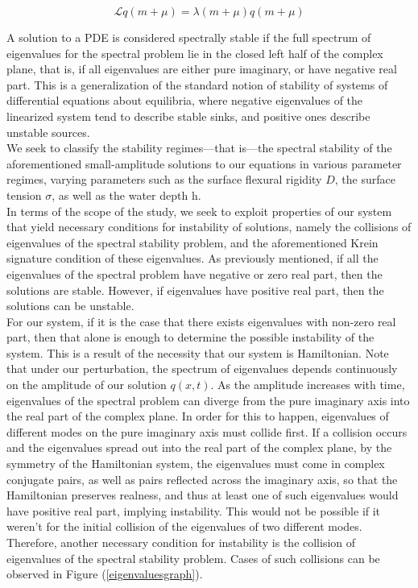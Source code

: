 \documentclass{article}
\begin{document}
\begin{equation} \label{eq1}
  \mathscr{L}q(m+\mu) =   \lambda(m+\mu) q(m+\mu)
\end{equation}

A solution to a PDE is considered spectrally stable if the full spectrum of eigenvalues for the spectral problem lie in the closed left half of the complex plane, that is, if all eigenvalues are either pure imaginary, or have negative real part. This is a generalization of the standard notion of stability of systems of differential equations about equilibria, where negative eigenvalues of the linearized system tend to describe stable sinks, and positive ones describe unstable sources.\\

We seek to classify the stability regimes—that is—the spectral stability of the aforementioned small-amplitude solutions to our equations in various parameter regimes, varying parameters such as the surface flexural rigidity \(D\), the surface tension \(\sigma\), as well as the water depth h. \\



In terms of the scope of the study, we seek to exploit properties of our system that yield necessary conditions for instability of solutions, namely the collisions of eigenvalues of the spectral stability problem, and the aforementioned Krein signature condition of these eigenvalues. As previously mentioned, if all the eigenvalues of the spectral problem have negative or zero real part, then the solutions are stable. However, if eigenvalues have positive real part, then the solutions can be unstable.\\



For our system, if it is the case that there exists eigenvalues with non-zero real part, then that alone is enough to determine the possible instability of the system. This is a result of the necessity that our system is Hamiltonian. Note that under our perturbation, the spectrum of eigenvalues depends continuously on the amplitude of our solution \(q(x,t)\). As the amplitude increases with time, eigenvalues of the spectral problem can diverge from the pure imaginary axis into the real part of the complex plane. In order for this to happen, eigenvalues of different modes on the pure imaginary axis must collide first. If a collision occurs and the eigenvalues spread out into the real part of the complex plane, by the symmetry of the Hamiltonian system, the eigenvalues must come in complex conjugate pairs, as well as pairs reflected across the imaginary axis, so that the Hamiltonian preserves realness, and thus at least one of such eigenvalues would have positive real part, implying instability. This would not be possible if it weren't for the initial collision of the eigenvalues of two different modes. Therefore, another necessary condition for instability is the collision of eigenvalues of the spectral stability problem. Cases of such collisions can be observed in Figure (\ref{eigenvaluesgraph}). \\
\end{document}
